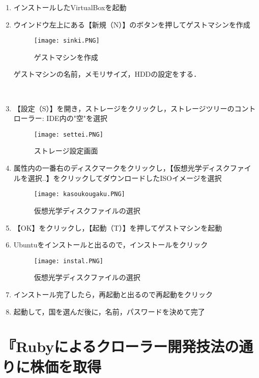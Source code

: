 \begin{enumerate}
  \item インストールしたVirtualBoxを起動
  \item ウインドウ左上にある【新規（N）】のボタンを押してゲストマシンを作成

\begin{figure}[H]
\centering
\texttt{[image: sinki.PNG]}
\caption{ゲストマシンを作成}\label{サンプル図}
\end{figure}
ゲストマシンの名前，メモリサイズ，HDDの設定をする．


　\item 【設定（S）】を開き，ストレージをクリックし，ストレージツリーのコントローラー: IDE内の"空"を選択
\begin{figure}[H]
\centering
\texttt{[image: settei.PNG]}
\caption{ストレージ設定画面}\label{サンプル図}
\end{figure}

  \item 属性内の一番右のディスクマークをクリックし，【仮想光学ディスクファイルを選択..】をクリックしてダウンロードしたISOイメージを選択

\begin{figure}[H]
\centering
\texttt{[image: kasoukougaku.PNG]}
\caption{仮想光学ディスクファイルの選択}\label{サンプル図}
\end{figure}
 

 \item 【OK】をクリックし，【起動（T）】を押してゲストマシンを起動
  \item Ubuntuをインストールと出るので，インストールをクリック


\begin{figure}[H]
\centering
\texttt{[image: instal.PNG]}
\caption{仮想光学ディスクファイルの選択}\label{サンプル図}
\end{figure}

  \item インストール完了したら，再起動と出るので再起動をクリック
　\item 起動して，国を選んだ後に，名前，パスワードを決めて完了
\end{enumerate}



\section{『Rubyによるクローラー開発技法の通りに株価を取得}


